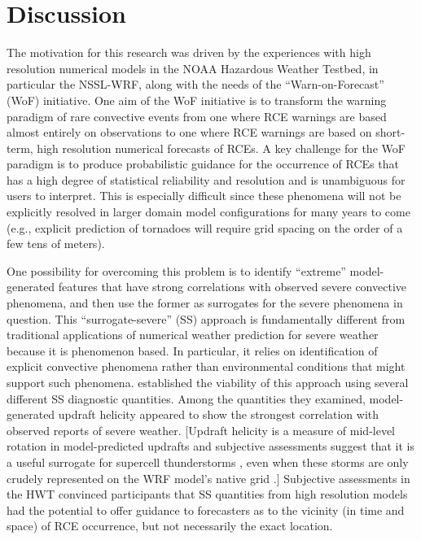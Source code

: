 

\chapter{Discussion}
\label{discussion}


The motivation for this research was driven by the experiences with high resolution numerical models in the NOAA Hazardous Weather Testbed, in particular the NSSL-WRF, along with the needs of the ``Warn-on-Forecast'' (WoF) initiative.
One aim of the WoF initiative is to transform the warning paradigm of rare convective events from one where RCE warnings are based almost entirely on observations to one where RCE warnings are based on short-term, high resolution numerical forecasts of RCEs.
A key challenge for the WoF paradigm is to produce probabilistic guidance for the occurrence of RCEs that has a high degree of statistical reliability and resolution and is unambiguous for users to interpret.
This is especially difficult since these phenomena will not be explicitly resolved in larger domain model configurations for many years to come (e.g., explicit prediction of tornadoes will require grid spacing on the order of a few tens of meters).


One possibility for overcoming this problem is to identify ``extreme'' model-generated features that have strong correlations with observed severe convective phenomena, and then use the former as surrogates for the severe phenomena in question.
This ``surrogate-severe'' (SS) approach is fundamentally different from traditional applications of numerical weather prediction for severe weather because it is phenomenon based.
In particular, it relies on identification of explicit convective phenomena rather than environmental conditions that might support such phenomena.
\cite{Sobash2011} established the viability of this approach using several different SS diagnostic quantities.
Among the quantities they examined, model-generated updraft helicity appeared to show the strongest correlation with observed reports of severe weather.
[Updraft helicity is a measure of mid-level rotation in model-predicted updrafts and subjective assessments suggest that it is a useful surrogate for supercell thunderstorms \citep{Kain2010}, even when these storms are only crudely represented on the WRF model's native grid \citep{Kain2008}.]
Subjective assessments in the HWT convinced participants that SS quantities from high resolution models had the potential to offer guidance to forecasters as to the vicinity (in time and space) of RCE occurrence, but not necessarily the exact location.


